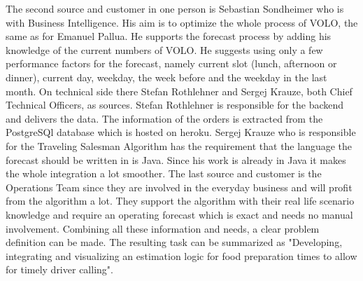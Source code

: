 The second source and customer in one person is Sebastian Sondheimer who is with Business Intelligence. His aim is to optimize the whole process of VOLO, the same as for Emanuel Pallua. He supports the forecast process by adding his knowledge of the current numbers of VOLO. He suggests using only a few performance factors for the forecast, namely current slot (lunch, afternoon or dinner), current day, weekday, the week before and the weekday in the last month.\newline
On technical side there Stefan Rothlehner and Sergej Krauze, both Chief Technical Officers, as sources. Stefan Rothlehner is responsible for the backend and delivers the data. The information of the orders is extracted from the PostgreSQl database which is hosted on heroku. Sergej Krauze who is responsible for the Traveling Salesman Algorithm has the requirement that the language the forecast should be written in is Java. Since his work is already in Java it makes the whole integration a lot smoother.\newline
The last source and customer is the Operations Team since they are involved in the everyday business and will profit from the algorithm a lot. They support the algorithm with their real life scenario knowledge and require an operating forecast which is exact and needs no manual involvement.\newline
Combining all these information and needs, a clear problem definition can be made. The resulting task can be summarized as "Developing, integrating and visualizing an estimation logic for food preparation times to allow for timely driver calling".
